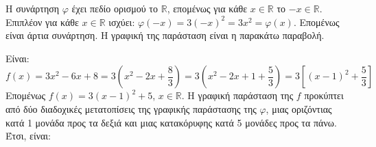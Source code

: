 \begin{alist}
\item Η συνάρτηση $\varphi$ έχει πεδίο ορισμού το $\mathbb{R}$, επομένως για κάθε $x \in \mathbb{R}$ το $-x \in \mathbb{R}$.
Επιπλέον για κάθε $x \in \mathbb{R}$ ισχύει: $\varphi(-x) = 3(-x)^2 = 3x^2 = \varphi(x)$.
Επομένως είναι άρτια συνάρτηση.
Η γραφική της παράσταση είναι η παρακάτω παραβολή.
\begin{center}
\end{center}
\item Είναι:
\[f(x) = 3x^2 - 6x + 8 = 3\left(x^2 - 2x + \dfrac{8}{3}\right) = 3\left(x^2 - 2x + 1 + \dfrac{5}{3}\right) = 3\left[(x - 1)^2 + \dfrac{5}{3}\right]\]
Επομένως $f(x) = 3(x - 1)^2 + 5$, $x \in \mathbb{R}$.
Η γραφική παράσταση της $f$ προκύπτει από δύο διαδοχικές μετατοπίσεις της γραφικής παράστασης της $\varphi$, μιας οριζόντιας κατά 1 μονάδα προς τα δεξιά και μιας κατακόρυφης κατά 5 μονάδες προς τα πάνω. Έτσι, είναι:
\end{alist}

